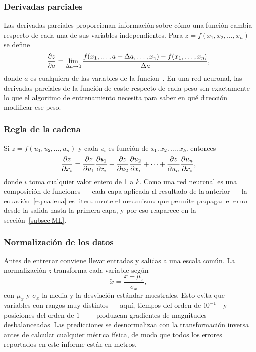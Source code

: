 \documentclass[titlepage,11pt]{article}
\begin{document}
\subsubsection{Derivadas parciales}
Las derivadas parciales proporcionan información sobre cómo una función cambia
respecto de cada una de sus variables independientes. Para
$z=f(x_1,x_2,\ldots,x_n)$ se define
\begin{equation}
  \pdv{z}{a}=\lim_{\Delta a\to0}
  \frac{f(x_1,\ldots,a+\Delta a,\ldots,x_n)-f(x_1,\ldots,x_n)}{\Delta a},
\end{equation}
donde $a$ es cualquiera de las variables de la función~\cite{zill_1985_clculo}.
En una red neuronal, las derivadas parciales de la función de coste respecto de
cada peso son exactamente lo que el algoritmo de entrenamiento necesita para
saber en qué dirección modificar ese peso.

\subsubsection{Regla de la cadena}
Si $z=f(u_1,u_2,\ldots,u_n)$ y cada $u_i$ es función de $x_1,x_2,\ldots,x_k$,
entonces~\cite{zill_1985_clculo}
\begin{equation}
  \pdv{z}{x_i}=\pdv{z}{u_1}\pdv{u_1}{x_i}+\pdv{z}{u_2}\pdv{u_2}{x_i}
  +\cdots+\pdv{z}{u_n}\pdv{u_n}{x_i},
  \label{eq:cadena}
\end{equation}
donde $i$ toma cualquier valor entero de 1 a $k$. Como una red neuronal es una
composición de funciones --- cada capa aplicada al resultado de la anterior ---
la ecuación~\eqref{eq:cadena} es literalmente el mecanismo que permite
propagar el error desde la salida hasta la primera capa, y por eso reaparece en
la sección~\ref{subsec:ML}.

\subsubsection{Normalización de los datos}
\label{subsubsec:zscore}
Antes de entrenar conviene llevar entradas y salidas a una escala común. La
normalización $z$ transforma cada variable según
\begin{equation}
  \tilde x = \frac{x-\mu_x}{\sigma_x},
  \label{eq:zscore}
\end{equation}
con $\mu_x$ y $\sigma_x$ la media y la desviación estándar muestrales. Esto
evita que variables con rangos muy distintos --- aquí, tiempos del orden de
$10^{-1}$~\second\ y posiciones del orden de $1$~\meter\ --- produzcan
gradientes de magnitudes desbalanceadas. Las predicciones se
desnormalizan con la transformación inversa antes de calcular cualquier
métrica física, de modo que todos los errores reportados en este informe están
en metros.
\end{document}
